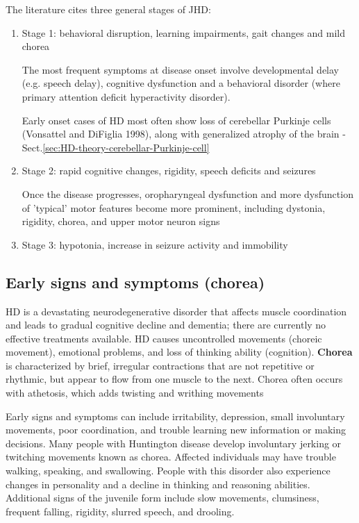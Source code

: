 The literature cites three general stages of JHD: 
\begin{enumerate}
  \item Stage 1: behavioral disruption, learning impairments, gait changes and
  mild chorea 

The most frequent symptoms at disease onset involve developmental
delay (e.g. speech delay), cognitive dysfunction and a behavioral disorder
(where primary attention deficit hyperactivity disorder).

Early onset cases of HD most often show loss of cerebellar Purkinje cells
(Vonsattel and DiFiglia 1998), along with generalized atrophy of the brain -
Sect.\ref{sec:HD-theory-cerebellar-Purkinje-cell}

 
  \item Stage 2: rapid cognitive changes, rigidity, speech deficits and seizures

Once the disease progresses, oropharyngeal dysfunction and more
dysfunction of 'typical' motor features become more prominent, including
dystonia, rigidity, chorea, and upper motor neuron signs
  
  \item Stage 3: hypotonia, increase in seizure activity and immobility
\end{enumerate}
   

\subsection{Early signs and symptoms (chorea)}
\label{sec:chorea}

HD is a devastating neurodegenerative disorder that affects muscle coordination
and leads to gradual cognitive decline and dementia; there are currently no
effective treatments available. HD causes uncontrolled movements (choreic
movement), emotional problems, and loss of thinking ability (cognition).
{\bf Chorea} is characterized by brief, irregular contractions that are not
repetitive or rhythmic, but appear to flow from one muscle to the next. 
Chorea often occurs with athetosis, which adds twisting and writhing movements

Early signs and symptoms can include irritability, depression, small involuntary
movements, poor coordination, and trouble learning new information or making
decisions. Many people with Huntington disease develop involuntary jerking or
twitching movements known as chorea. Affected individuals may have trouble
walking, speaking, and swallowing. People with this disorder also experience
changes in personality and a decline in thinking and reasoning abilities.
Additional signs of the juvenile form include slow movements, clumsiness,
frequent falling, rigidity, slurred speech, and drooling.

